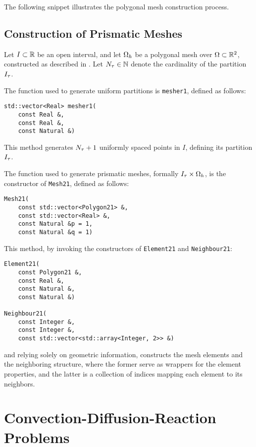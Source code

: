 The following snippet illustrates the polygonal mesh construction process.



\newpage
\subsection{Construction of Prismatic Meshes}

Let $I \subset \mathbb{R}$ be an open interval, and let $\Omega_{h}$ be a polygonal mesh over $\Omega \subset \mathbb{R}^{2}$, constructed as described in . Let $N_{\tau} \in \mathbb{N}$ denote the cardinality of the partition $I_{\tau}$.

The function used to generate uniform partitions is \lstinline{mesher1}, defined as follows:
\begin{lstlisting}[style=cpp]
std::vector<Real> mesher1(
    const Real &, 
    const Real &, 
    const Natural &)
\end{lstlisting}

This method generates $N_{\tau} + 1$ uniformly spaced points in $I$, defining its partition $I_{\tau}$.

The function used to generate prismatic meshes, formally $I_{\tau} \times \Omega_{h}$, is the constructor of \lstinline{Mesh21}, defined as follows:
\begin{lstlisting}[style=cpp]
Mesh21(
    const std::vector<Polygon21> &, 
    const std::vector<Real> &, 
    const Natural &p = 1, 
    const Natural &q = 1)
\end{lstlisting}

This method, by invoking the constructors of \lstinline{Element21} and \lstinline{Neighbour21}:
\begin{lstlisting}[style=cpp]
Element21(
    const Polygon21 &, 
    const Real &, 
    const Natural &, 
    const Natural &)

Neighbour21(
    const Integer &, 
    const Integer &, 
    const std::vector<std::array<Integer, 2>> &)
\end{lstlisting}
and relying solely on geometric information, constructs the mesh elements and the neighboring structure, where the former serve as wrappers for the element properties, and the latter is a collection of indices mapping each element to its neighbors.

\newpage
\section{Convection-Diffusion-Reaction Problems} \label{section:problem_components}


